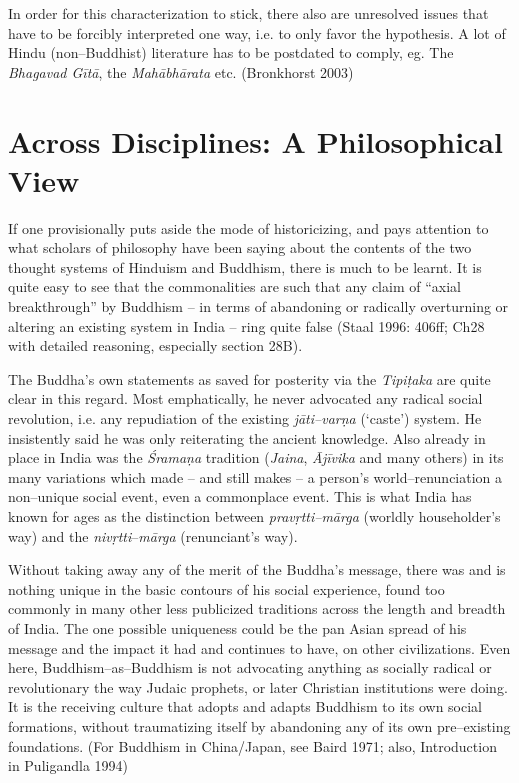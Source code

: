 In order for this characterization to stick, there also are unresolved issues that have to be forcibly interpreted one way, i.e. to only favor the hypothesis. A lot of Hindu (non–Buddhist) literature has to be postdated to comply, eg. The \textit{Bhagavad Gītā}, the \textit{Mahābhārata} etc. (Bronkhorst 2003)


\section*{Across Disciplines: A Philosophical View}

If one provisionally puts aside the mode of historicizing, and pays attention to what scholars of philosophy have been saying about the contents of the two thought systems of Hinduism and Buddhism, there is much to be learnt. It is quite easy to see that the commonalities are such that any claim of “axial breakthrough” by Buddhism – in terms of abandoning or radically overturning or altering an existing system in India – ring quite false (Staal 1996: 406ff; Ch28 with detailed reasoning, especially section 28B).

The Buddha’s own statements as saved for posterity via the \textit{Tipiṭaka} are quite clear in this regard. Most emphatically, he never advocated any radical social revolution, i.e. any repudiation of the existing \textit{jāti–varṇa} (‘caste’) system. He insistently said he was only reiterating the ancient knowledge. Also already in place in India was the \textit{Śramaṇa} tradition (\textit{Jaina}, \textit{Ājīvika} and many others) in its many variations which made – and still makes – a person’s world–renunciation a non–unique social event, even a commonplace event. This is what India has known for ages as the distinction between \textit{pravṛtti–mārga} (worldly householder’s way) and the \textit{nivṛtti}–\textit{mārga} (renunciant’s way).

Without taking away any of the merit of the Buddha’s message, there was and is nothing unique in the basic contours of his social experience, found too commonly in many other less publicized traditions across the length and breadth of India. The one possible uniqueness could be the pan Asian spread of his message and the impact it had and continues to have, on other civilizations. Even here, Buddhism–as–Buddhism is not advocating anything as socially radical or revolutionary the way Judaic prophets, or later Christian institutions were doing. It is the receiving culture that adopts and adapts Buddhism to its own social formations, without traumatizing itself by abandoning any of its own pre–existing foundations. (For Buddhism in China/Japan, see Baird 1971; also, Introduction in Puligandla 1994)


